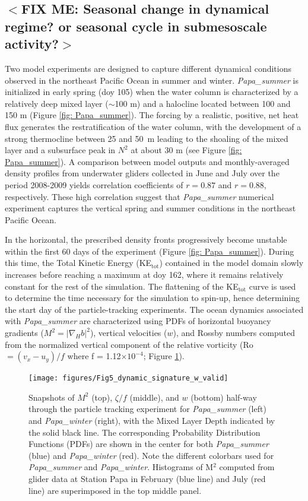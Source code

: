 \documentclass[draft,linenumbers]{agujournal2018}
\newcommand{\fixme}[1]{\color{red}$<$\textbf{FIX ME: #1}$>$\color{black}}
\begin{document}
\subsection{\fixme{Seasonal change in dynamical regime? or seasonal cycle in submesoscale activity?}}

Two model experiments are designed to capture different dynamical conditions observed in the northeast Pacific Ocean in summer and winter. \textit{Papa\_summer} is initialized in early spring (doy 105) when the water column is characterized by a relatively deep mixed layer ($\sim$100 m) and a halocline located between 100 and 150 m (Figure \ref{fig: Papa_summer}). The forcing by a realistic, positive, net heat flux generates the restratification of the water column, with the development of a strong thermocline between 25 and 50~m leading to the shoaling of the mixed layer and a subsurface peak in $N^2$ at about 30 m (see Figure \ref{fig: Papa_summer}). A comparison between model outputs and monthly-averaged density profiles from underwater gliders collected in June and July over the period 2008-2009 yields correlation coefficients of $r = 0.87$ and $r = 0.88$, respectively. These high correlation suggest that \textit{Papa\_summer} numerical experiment captures the vertical spring and summer conditions in the northeast Pacific Ocean.

In the horizontal, the prescribed density fronts progressively become unstable within the first 60 days of the experiment (Figure \ref{fig: Papa_summer}). During this time, the Total Kinetic Energy (KE$_{\text{tot}}$) contained in the model domain slowly increases before reaching a maximum at doy 162, where it remains relatively constant for the rest of the simulation. The flattening of the KE$_{\text{tot}}$ curve is used to determine the time necessary for the simulation to spin-up, hence determining the start day of the particle-tracking experiments. The ocean dynamics associated with \textit{Papa\_summer} are characterized using PDFs of horizontal buoyancy gradients ($M^2 = |\nabla_Hb|^2$), vertical velocities ($w$), and Rossby numbers computed from the normalized vertical component of the relative vorticity (Ro $=(v_x - u_y)/f$ where f = 1.12$\times10^{-4}$; Figure \ref{fig: dynamics}).

\begin{figure}[t]
	\centering
	\texttt{[image: figures/Fig5\_dynamic\_signature\_w\_valid]}
	\caption{Snapshots of $M^2$ (top), $\zeta /f$ (middle), and $w$ (bottom) half-way through the particle tracking experiment for \textit{Papa\_summer} (left) and \textit{Papa\_winter} (right), with the Mixed Layer Depth indicated by the solid black line. The corresponding Probability Distribution Functions (PDFs) are shown in the center for both \textit{Papa\_summer} (blue) and \textit{Papa\_winter} (red). Note the different colorbars used for \textit{Papa\_summer} and \textit{Papa\_winter}. Histograms of M$^2$ computed from glider data at Station Papa in February (blue line) and July (red line) are superimposed in the top middle panel.}
	\label{fig: dynamics}
\end{figure}
\end{document}
